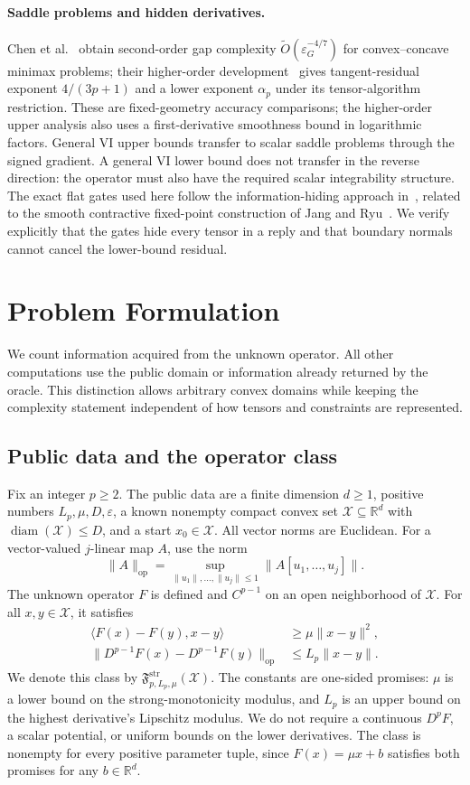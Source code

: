 \documentclass[11pt]{article}
\numberwithin{equation}{section}
\theoremstyle{definition}
\theoremstyle{remark}
\newcommand{\R}{\mathbb R}
\newcommand{\ap}{\alpha_p}
\begin{document}
\paragraph{Saddle problems and hidden derivatives.}
Chen et al.~\cite{chen2025} obtain second-order gap complexity
$\widetilde O(\varepsilon_G^{-4/7})$ for convex--concave minimax
problems; their higher-order development~\cite{chen2026saddle} gives
tangent-residual exponent $4/(3p+1)$ and a lower exponent $\ap$ under
its tensor-algorithm restriction. These are fixed-geometry accuracy
comparisons; the higher-order upper analysis also uses a first-derivative
smoothness bound in logarithmic factors. General VI upper bounds transfer to
scalar saddle problems through the signed gradient. A general VI lower
bound does not transfer in the reverse direction: the operator must also
have the required scalar integrability structure.
The exact flat gates used here follow the information-hiding approach
in~\cite{zhang2026}, related to the smooth contractive fixed-point
construction of Jang and Ryu~\cite{jang2026}. We verify explicitly that
the gates hide every tensor in a reply and that boundary normals cannot
cancel the lower-bound residual.


\section{Problem Formulation}\label{sec:setup}
We count information acquired from the unknown operator. All other
computations use the public domain or information already returned by the
oracle. This distinction allows arbitrary convex domains while keeping
the complexity statement independent of how tensors and constraints are
represented.

\subsection{Public data and the operator class}
Fix an integer $p\ge2$. The public data are a finite dimension $d\ge1$,
positive numbers $L_p,\mu,D,\varepsilon$, a known nonempty compact convex
set $\mathcal X\subseteq\R^d$ with $\operatorname{diam}(\mathcal X)\le D$,
and a start $x_0\in\mathcal X$. All vector norms are Euclidean. For a
vector-valued $j$-linear map $A$, use the norm
\[
\|A\|_{\mathrm{op}}
=\sup_{\|u_1\|,\ldots,\|u_j\|\le1}
\|A[u_1,\ldots,u_j]\|.
\]
The unknown operator $F$ is defined and $C^{p-1}$ on an open neighborhood
of $\mathcal X$. For all $x,y\in\mathcal X$, it satisfies
\begin{align}
\langle F(x)-F(y),x-y\rangle
&\ge\mu\|x-y\|^2,\label{eq:strong-monotonicity}\\
\|D^{p-1}F(x)-D^{p-1}F(y)\|_{\mathrm{op}}
&\le L_p\|x-y\|.\label{eq:operator-smoothness}
\end{align}
We denote this class by
$\mathfrak F^{\mathrm{str}}_{p,L_p,\mu}(\mathcal X)$.
The constants are one-sided promises: $\mu$ is a lower bound on the
strong-monotonicity modulus, and $L_p$ is an upper bound on the highest
derivative's Lipschitz modulus. We do not require a continuous $D^pF$, a
scalar potential, or uniform bounds on the lower derivatives. The class
is nonempty for every positive parameter tuple, since
$F(x)=\mu x+b$ satisfies both promises for any $b\in\R^d$.
\end{document}
